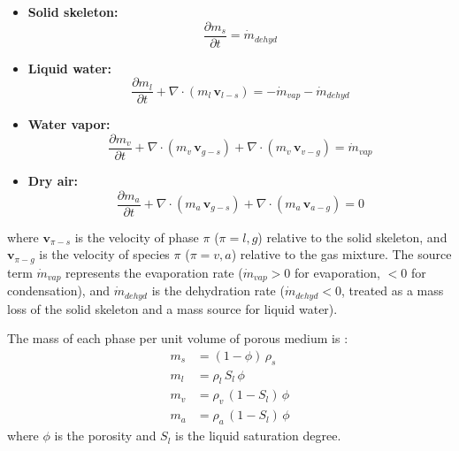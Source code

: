 \begin{itemize}
    \item \textbf{Solid skeleton:}
    \begin{equation}
        \frac{\partial m_s}{\partial t} = \dot{m}_{dehyd} 
        \label{eq:mass_solid}
    \end{equation}

    \item \textbf{Liquid water:}
    \begin{equation}
        \frac{\partial m_l}{\partial t} + \nabla\cdot(m_l\,\mathbf{v}_{l-s}) = -\dot{m}_{vap} - \dot{m}_{dehyd} \label{eq:mass_liquid}
    \end{equation}

    \item \textbf{Water vapor:}
    \begin{equation}
        \frac{\partial m_v}{\partial t} + \nabla\cdot(m_v\,\mathbf{v}_{g-s}) + \nabla\cdot(m_v\,\mathbf{v}_{v-g}) = \dot{m}_{vap}
        \label{eq:mass_vapor}
    \end{equation}
    \item \textbf{Dry air:}
    \begin{equation}
        \frac{\partial m_a}{\partial t} + \nabla\cdot(m_a\,\mathbf{v}_{g-s}) + \nabla\cdot(m_a\,\mathbf{v}_{a-g}) = 0
        \label{eq:mass_air}
    \end{equation}

\end{itemize}

where $\mathbf{v}_{\pi-s}$ is the velocity of phase $\pi$ ($\pi = l, g$) relative to the solid skeleton, and $\mathbf{v}_{\pi-g}$ is the velocity of species $\pi$ ($\pi = v, a$) relative to the gas mixture. The source term $\dot{m}_{vap}$ represents the evaporation rate ($\dot{m}_{vap} > 0$ for evaporation, $< 0$ for condensation), and $\dot{m}_{dehyd}$ is the dehydration rate ($\dot{m}_{dehyd} < 0$, treated as a mass loss of the solid skeleton and a mass source for liquid water).

The mass of each phase per unit volume of porous medium is \cite{dauti2018}:
\begin{align}
    m_s &= (1-\phi)\,\rho_s \label{eq:ms} \\
    m_l &= \rho_l\, S_l\, \phi \label{eq:ml} \\
    m_v &= \rho_v\,(1-S_l)\,\phi \label{eq:mv} \\
    m_a &= \rho_a\,(1-S_l)\,\phi \label{eq:ma}
\end{align}
where $\phi$ is the porosity and $S_l$ is the liquid saturation degree.

